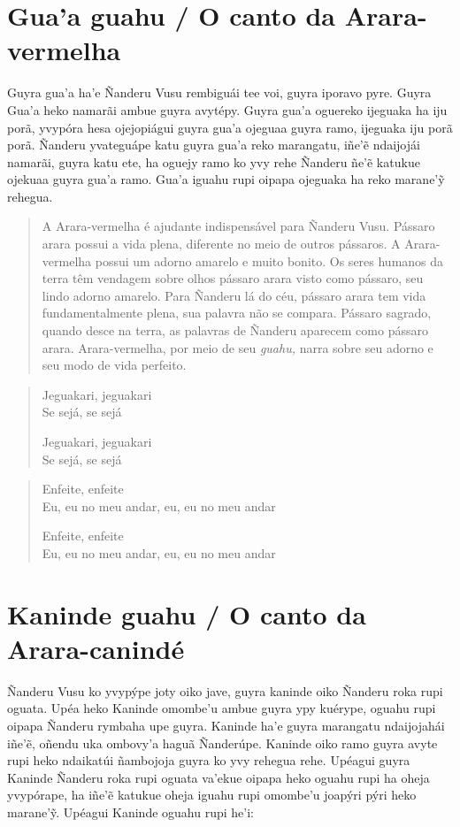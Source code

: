 \begin{itemize}
\chapter{Gua'a guahu / O canto da Arara-vermelha}

Guyra gua'a ha'e Ñanderu Vusu rembiguái tee voi, guyra iporavo pyre.
Guyra Gua'a heko namarãi ambue guyra avytépy. Guyra gua'a oguereko
ijeguaka ha iju porã, yvypóra hesa ojejopiágui guyra gua'a ojeguaa guyra
ramo, ijeguaka iju porã porã. Ñanderu yvateguápe katu guyra gua'a reko
marangatu, iñe'ẽ ndaijojái namarãi, guyra katu ete, ha oguejy ramo ko
yvy rehe Ñanderu ñe'ẽ katukue ojekuaa guyra gua'a ramo. Gua'a iguahu
rupi oipapa ojeguaka ha reko marane'ỹ rehegua.

\begin{quote}
A Arara-vermelha é ajudante indispensável para Ñanderu Vusu. Pássaro
arara possui a vida plena, diferente no meio de outros pássaros. A
Arara-vermelha possui um adorno amarelo e muito bonito. Os seres humanos
da terra têm vendagem sobre olhos pássaro arara visto como pássaro, seu
lindo adorno amarelo. Para Ñanderu lá do céu, pássaro arara tem vida
fundamentalmente plena, sua palavra não se compara. Pássaro sagrado,
quando desce na terra, as palavras de Ñanderu aparecem como pássaro
arara. Arara-vermelha, por meio de seu \emph{guahu,} narra sobre seu
adorno e seu modo de vida perfeito.
\end{quote}

\begin{verse}
Jeguakari, jeguakari\\
Se sejá, se sejá

Jeguakari, jeguakari\\
Se sejá, se sejá
\end{verse}

\begin{verse}
Enfeite, enfeite\\
Eu, eu no meu andar, eu, eu no meu andar

Enfeite, enfeite\\
Eu, eu no meu andar, eu, eu no meu andar
\end{verse}

\chapter{Kaninde guahu / O canto da Arara-canindé}

Ñanderu Vusu ko yvypýpe joty oiko jave, guyra kaninde oiko Ñanderu roka
rupi oguata. Upéa heko Kaninde omombe'u ambue guyra ypy kuérype, oguahu
rupi oipapa Ñanderu rymbaha upe guyra. Kaninde ha'e guyra marangatu
ndaijojahái iñe'ẽ, oñendu uka ombovy'a haguã Ñanderúpe. Kaninde oiko
ramo guyra avyte rupi heko ndaikatúi ñambojoja guyra ko yvy rehegua
rehe. Upéagui guyra Kaninde Ñanderu roka rupi oguata va'ekue oipapa heko
oguahu rupi ha oheja yvypórape, ha iñe'ẽ katukue oheja iguahu rupi
omombe'u joapýri pýri heko marane'ỹ. Upéagui Kaninde oguahu rupi he'i:


\end{itemize}
